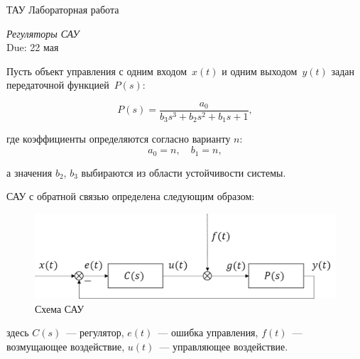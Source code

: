 \documentclass[a4paper,oneside,10pt]{book}
\theoremstyle{definition}
\begin{document}
\begin{center}
	{\large  ТАУ \hspace{0.1cm} Лабораторная работа }

	\vspace{5pt}
	\textit{\large Регуляторы САУ}\\ %
	\vspace{10pt}
	Due: 22 мая %
\end{center}

\vspace{0.2 cm}



Пусть объект управления с одним входом~$ x(t) $ и одним выходом~$ y(t) $ задан передаточной функцией~$ P(s) $:

\begin{equation*}
	P(s) =
	\dfrac{a_0}
	{b_3 s^3 + b_2 s^2 + b_1 s +1} ,
\end{equation*}

где коэффициенты  определяются согласно варианту $ n $:
\begin{equation*}
	a_0 = n, \quad b_1 = n,
\end{equation*}

а значения $b_2$, $b_3$ выбираются из области устойчивости системы.

САУ с обратной связью определена следующим образом:

\begin{figure}[h]
	\centering
	\includegraphics[width=0.8\linewidth]{tau.png}
	\caption{Схема САУ}
\end{figure}
здесь $C(s)$~--- регулятор,
$e(t)$~--- ошибка управления,
$f(t)$~--- возмущающее воздействие,
$u(t)$~--- управляющее воздействие.
\end{document}
